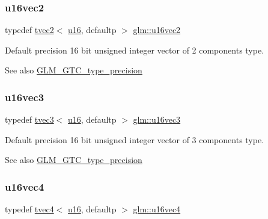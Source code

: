 \subsubsection{\texorpdfstring{u16vec2}{u16vec2}}
{\footnotesize\ttfamily typedef \hyperlink{structglm_1_1tvec2}{tvec2}$<$ \hyperlink{group__gtc__type__precision_gae7a1571503f83d2264ddfa705a6b082a}{u16}, defaultp $>$ \hyperlink{group__gtc__type__precision_ga10e8900b9610f930772aa55aee8e3121}{glm\+::u16vec2}}

Default precision 16 bit unsigned integer vector of 2 components type. \begin{DoxySeeAlso}{See also}
\hyperlink{group__gtc__type__precision}{G\+L\+M\+\_\+\+G\+T\+C\+\_\+type\+\_\+precision} 
\end{DoxySeeAlso}
\mbox{\label{group__gtc__type__precision_ga947d0d003e016eaf2038d6843b427257}} 
\subsubsection{\texorpdfstring{u16vec3}{u16vec3}}
{\footnotesize\ttfamily typedef \hyperlink{structglm_1_1tvec3}{tvec3}$<$ \hyperlink{group__gtc__type__precision_gae7a1571503f83d2264ddfa705a6b082a}{u16}, defaultp $>$ \hyperlink{group__gtc__type__precision_ga947d0d003e016eaf2038d6843b427257}{glm\+::u16vec3}}

Default precision 16 bit unsigned integer vector of 3 components type. \begin{DoxySeeAlso}{See also}
\hyperlink{group__gtc__type__precision}{G\+L\+M\+\_\+\+G\+T\+C\+\_\+type\+\_\+precision} 
\end{DoxySeeAlso}
\mbox{\label{group__gtc__type__precision_ga87d1f39c523b4d6d4de0c2778afe5474}} 
\subsubsection{\texorpdfstring{u16vec4}{u16vec4}}
{\footnotesize\ttfamily typedef \hyperlink{structglm_1_1tvec4}{tvec4}$<$ \hyperlink{group__gtc__type__precision_gae7a1571503f83d2264ddfa705a6b082a}{u16}, defaultp $>$ \hyperlink{group__gtc__type__precision_ga87d1f39c523b4d6d4de0c2778afe5474}{glm\+::u16vec4}}

